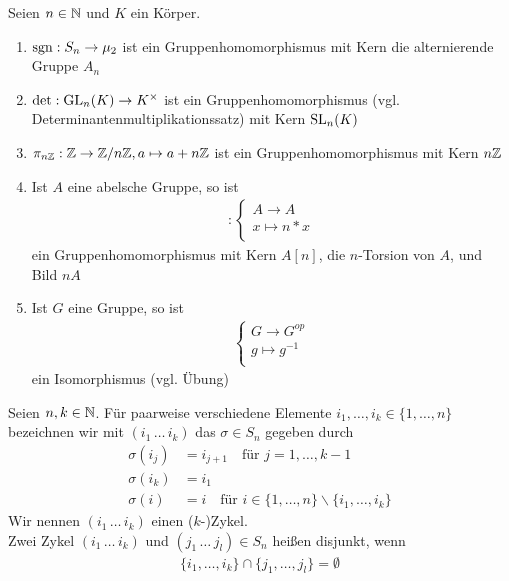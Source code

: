 \begin{bsp}
	Seien $n \in \mathbb{N}$ und $K$ ein Körper.
	\begin{enumerate}
		\item $\operatorname{sgn}: S_n \to \mu_2$ ist ein Gruppenhomomorphismus mit Kern die alternierende Gruppe $A_n$
		\item $\det: \operatorname{GL}_n(K) \to {K}^{\times}$ ist ein Gruppenhomomorphismus (vgl. Determinantenmultiplikationssatz) mit Kern $\operatorname{SL}_n(K)$
		\item $\pi_{n\mathbb{Z}}: \mathbb{Z} \to \mathbb{Z} / n \mathbb{Z}, a \mapsto a + n\mathbb{Z}$ ist ein Gruppenhomomorphismus mit Kern $n\mathbb{Z}$
		\item  Ist $A$ eine abelsche Gruppe, so ist
		\begin{align*}
			[n]: \begin{cases}
			A \to A \\
			x \mapsto n*x \\
			\end{cases}
		\end{align*}
		ein Gruppenhomomorphismus mit Kern $A[n]$, die $n$-Torsion von $A$, und Bild $nA$
		\item Ist $G$ eine Gruppe, so ist
		\begin{align*}
			\begin{cases}
			G \to G^{op} \\
			g \mapsto g^{-1} \\
			\end{cases}
		\end{align*}
		ein Isomorphismus (vgl. Übung)
	\end{enumerate}
\end{bsp}

\begin{defin}
	Seien $n,k \in \mathbb{N}$. Für paarweise verschiedene Elemente $i_1, \dots , i_k \in \{1 , \dots , n\}$ bezeichnen wir mit $(i_1 \, \dots \, i_k)$ das $\sigma \in S_n$ gegeben durch
	\begin{align*}
		\sigma (i_j) &= i_{j+1} \quad \text{für } j=1 , \dots , k-1 \\
		\sigma (i_k) &= i_1 \\
		\sigma (i)  &= i \quad \text{für } i \in \{1,\dots,n\} \backslash \{i_1 , \dots , i_k \}
	\end{align*}
	Wir nennen $(i_1 \, \dots \, i_k)$ einen ($k$-)Zykel. \\
	Zwei Zykel $(i_1 \, \dots \, i_k)$ und $(j_1 \, \dots \, j_l) \in S_n$ heißen disjunkt, wenn
	\begin{align*}
		\{i_1 , \dots , i_k \} \cap \{j_1 , \dots , j_l \} = \emptyset
	\end{align*}
\end{defin}

